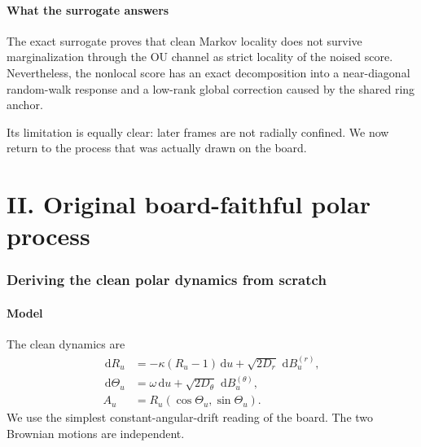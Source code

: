 \documentclass[11pt,a4paper]{article}
\newcommand{\dd}{\,\mathrm d}
\begin{document}
\begin{table}[H]
\centering
\caption{Selected surrogate diagnostics. ``Marginal RMSE'' is the error from using the one-frame marginal score. $L_{95}$ is the response-mass radius. $L_{5\%}$ is only reported at the diffusion times for which the complete window sweep was run.}
\label{tab:surrogate-results}

\end{table}

\subsection{What the surrogate answers}

\begin{keyresult}
The exact surrogate proves that clean Markov locality does not survive marginalization through the OU channel as strict locality of the noised score. Nevertheless, the nonlocal score has an exact decomposition into a near-diagonal random-walk response and a low-rank global correction caused by the shared ring anchor.
\end{keyresult}

Its limitation is equally clear: later frames are not radially confined. We now return to the process that was actually drawn on the board.

\FloatBarrier

\part{II. Original board-faithful polar process}

\section{Deriving the clean polar dynamics from scratch}

\subsection{Model}

The clean dynamics are
\begin{align}
 \dd R_u&=-\kappa(R_u-1)\dd u+\sqrt{2D_r}\,\dd B_u^{(r)},
 \label{eq:radial-sde}\\
 \dd\Theta_u&=\omega\dd u+\sqrt{2D_\theta}\,\dd B_u^{(\theta)},
 \label{eq:angular-sde}\\
 A_u&=R_u(\cos\Theta_u,\sin\Theta_u).
 \label{eq:polar-to-cart}
\end{align}
We use the simplest constant-angular-drift reading of the board. The two Brownian motions are independent.
\end{document}
